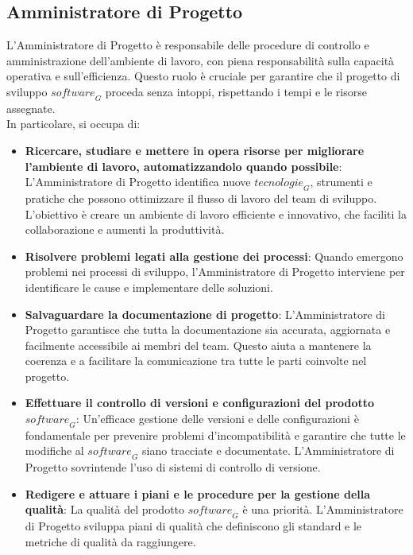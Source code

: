 \subsection{Amministratore di Progetto}
L'Amministratore di Progetto è responsabile delle procedure di controllo e amministrazione dell’ambiente di lavoro, con piena responsabilità sulla capacità operativa e sull’efficienza. Questo ruolo è cruciale per garantire che il progetto di sviluppo $\textit{software}_G$ proceda senza intoppi, rispettando i tempi e le risorse assegnate. \\
In particolare, si occupa di:
\begin{itemize}
\item \textbf{Ricercare, studiare e mettere in opera risorse per migliorare l’ambiente di lavoro, automatizzandolo quando possibile}: L'Amministratore di Progetto identifica nuove $\textit{tecnologie}_G$, strumenti e pratiche che possono ottimizzare il flusso di lavoro del team di sviluppo. L'obiettivo è creare un ambiente di lavoro efficiente e innovativo, che faciliti la collaborazione e aumenti la produttività.
\item \textbf{Risolvere problemi legati alla gestione dei processi}: Quando emergono problemi nei processi di sviluppo, l'Amministratore di Progetto interviene per identificare le cause e implementare delle soluzioni. 
\item \textbf{Salvaguardare la documentazione di progetto}: L'Amministratore di Progetto garantisce che tutta la documentazione sia accurata, aggiornata e facilmente accessibile ai membri del team. Questo aiuta a mantenere la coerenza e a facilitare la comunicazione tra tutte le parti coinvolte nel progetto.
\item \textbf{Effettuare il controllo di versioni e configurazioni del prodotto $\textit{software}_G$}: Un'efficace gestione delle versioni e delle configurazioni è fondamentale per prevenire problemi d'incompatibilità e garantire che tutte le modifiche al $\textit{software}_G$ siano tracciate e documentate. L'Amministratore di Progetto sovrintende l'uso di sistemi di controllo di versione.
\item \textbf{Redigere e attuare i piani e le procedure per la gestione della qualità}: La qualità del prodotto $\textit{software}_G$ è una priorità. L'Amministratore di Progetto sviluppa piani di qualità che definiscono gli standard e le metriche di qualità da raggiungere. 
\end{itemize}

